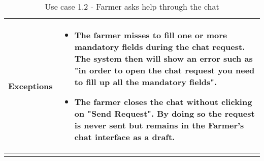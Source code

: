 \begin{longtable}[H]{ | l | p{10cm} | }
{\cellcolor[rgb]{0.753,0.753,0.753}}\textbf{Exceptions} &
\begin{itemize}
    \item The farmer misses to fill one or more mandatory fields during the chat request. The system then will show an error such as "in order to open the chat request you need to fill up all the mandatory fields".
    \item The farmer closes the chat without clicking on "Send Request". By doing so the request is never sent but remains in the Farmer’s chat interface as a draft.
\end{itemize}
\\ \hline
\caption{Use case 1.2 - Farmer asks help through the chat}
\\
\end{longtable}